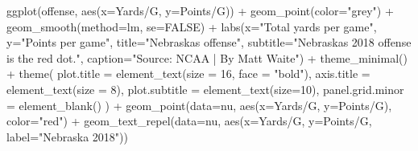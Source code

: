 \documentclass[
]{book}
\newenvironment{Shaded}{\begin{snugshade}}{\end{snugshade}}
\newcommand{\AttributeTok}[1]{\textcolor[rgb]{0.77,0.63,0.00}{#1}}
\newcommand{\ConstantTok}[1]{\textcolor[rgb]{0.00,0.00,0.00}{#1}}
\newcommand{\DecValTok}[1]{\textcolor[rgb]{0.00,0.00,0.81}{#1}}
\newcommand{\FunctionTok}[1]{\textcolor[rgb]{0.00,0.00,0.00}{#1}}
\newcommand{\NormalTok}[1]{#1}
\newcommand{\SpecialCharTok}[1]{\textcolor[rgb]{0.00,0.00,0.00}{#1}}
\newcommand{\StringTok}[1]{\textcolor[rgb]{0.31,0.60,0.02}{#1}}
\begin{document}
\begin{Shaded}
\begin{Highlighting}[]
\FunctionTok{ggplot}\NormalTok{(offense, }\FunctionTok{aes}\NormalTok{(}\AttributeTok{x=}\StringTok{\textasciigrave{}}\AttributeTok{Yards/G}\StringTok{\textasciigrave{}}\NormalTok{, }\AttributeTok{y=}\StringTok{\textasciigrave{}}\AttributeTok{Points/G}\StringTok{\textasciigrave{}}\NormalTok{)) }\SpecialCharTok{+} 
  \FunctionTok{geom\_point}\NormalTok{(}\AttributeTok{color=}\StringTok{"grey"}\NormalTok{) }\SpecialCharTok{+} \FunctionTok{geom\_smooth}\NormalTok{(}\AttributeTok{method=}\NormalTok{lm, }\AttributeTok{se=}\ConstantTok{FALSE}\NormalTok{) }\SpecialCharTok{+} 
  \FunctionTok{labs}\NormalTok{(}\AttributeTok{x=}\StringTok{"Total yards per game"}\NormalTok{, }\AttributeTok{y=}\StringTok{"Points per game"}\NormalTok{, }\AttributeTok{title=}\StringTok{"Nebraska\textquotesingle{}s offense"}\NormalTok{, }\AttributeTok{subtitle=}\StringTok{"Nebraska\textquotesingle{}s 2018 offense is the red dot."}\NormalTok{, }\AttributeTok{caption=}\StringTok{"Source: NCAA | By Matt Waite"}\NormalTok{) }\SpecialCharTok{+} 
  \FunctionTok{theme\_minimal}\NormalTok{() }\SpecialCharTok{+} 
  \FunctionTok{theme}\NormalTok{(}
    \AttributeTok{plot.title =} \FunctionTok{element\_text}\NormalTok{(}\AttributeTok{size =} \DecValTok{16}\NormalTok{, }\AttributeTok{face =} \StringTok{"bold"}\NormalTok{),}
    \AttributeTok{axis.title =} \FunctionTok{element\_text}\NormalTok{(}\AttributeTok{size =} \DecValTok{8}\NormalTok{), }
    \AttributeTok{plot.subtitle =} \FunctionTok{element\_text}\NormalTok{(}\AttributeTok{size=}\DecValTok{10}\NormalTok{), }
    \AttributeTok{panel.grid.minor =} \FunctionTok{element\_blank}\NormalTok{()}
\NormalTok{    ) }\SpecialCharTok{+}
  \FunctionTok{geom\_point}\NormalTok{(}\AttributeTok{data=}\NormalTok{nu, }\FunctionTok{aes}\NormalTok{(}\AttributeTok{x=}\StringTok{\textasciigrave{}}\AttributeTok{Yards/G}\StringTok{\textasciigrave{}}\NormalTok{, }\AttributeTok{y=}\StringTok{\textasciigrave{}}\AttributeTok{Points/G}\StringTok{\textasciigrave{}}\NormalTok{), }\AttributeTok{color=}\StringTok{"red"}\NormalTok{) }\SpecialCharTok{+} 
  \FunctionTok{geom\_text\_repel}\NormalTok{(}\AttributeTok{data=}\NormalTok{nu, }\FunctionTok{aes}\NormalTok{(}\AttributeTok{x=}\StringTok{\textasciigrave{}}\AttributeTok{Yards/G}\StringTok{\textasciigrave{}}\NormalTok{, }\AttributeTok{y=}\StringTok{\textasciigrave{}}\AttributeTok{Points/G}\StringTok{\textasciigrave{}}\NormalTok{, }\AttributeTok{label=}\StringTok{"Nebraska 2018"}\NormalTok{))}
\end{Highlighting}
\end{Shaded}
\end{document}

